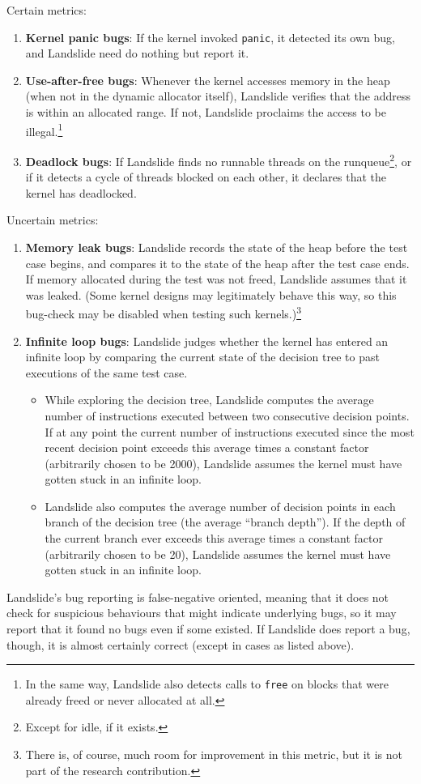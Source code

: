 Certain metrics:
\begin{enumerate}
	\item {\bf Kernel panic bugs}: If the kernel invoked \texttt{panic}, it detected its own bug, and Landslide need do nothing but report it.
	\item {\bf Use-after-free bugs}: Whenever the kernel accesses memory in the heap (when not in the dynamic allocator itself), Landslide verifies that the address is within an allocated range. If not, Landslide proclaims the access to be illegal.\footnote{In the same way, Landslide also detects calls to \texttt{free} on blocks that were already freed or never allocated at all.}
	\item {\bf Deadlock bugs}: If Landslide finds no runnable threads on the runqueue\footnote{Except for idle, if it exists.}, or if it detects a cycle of threads blocked on each other, it declares that the kernel has deadlocked.
\end{enumerate}
Uncertain metrics:
\begin{enumerate}
	\item {\bf Memory leak bugs}: Landslide records the state of the heap before the test case begins, and compares it to the state of the heap after the test case ends. If memory allocated during the test was not freed, Landslide assumes that it was leaked.
		(Some kernel designs may legitimately behave this way, so this bug-check may be disabled when testing such kernels.)\footnote{There is, of course, much room for improvement in this metric, but it is not part of the research contribution.}
	\item {\bf Infinite loop bugs}: Landslide judges whether the kernel has entered an infinite loop by comparing the current state of the decision tree to past executions of the same test case.
	\begin{itemize}
		\item While exploring the decision tree, Landslide computes the average number of instructions executed between two consecutive decision points. If at any point the current number of instructions executed since the most recent decision point exceeds this average times a constant factor (arbitrarily chosen to be 2000), Landslide assumes the kernel must have gotten stuck in an infinite loop.
		\item Landslide also computes the average number of decision points in each branch of the decision tree (the average ``branch depth''). If the depth of the current branch ever exceeds this average times a constant factor (arbitrarily chosen to be 20), Landslide assumes the kernel must have gotten stuck in an infinite loop.
	\end{itemize}
\end{enumerate}
Landslide's bug reporting is false-negative oriented, meaning that it does not check for suspicious behaviours that might indicate underlying bugs, so it may report that it found no bugs even if some existed. If Landslide does report a bug, though, it is almost certainly correct (except in cases as listed above).

